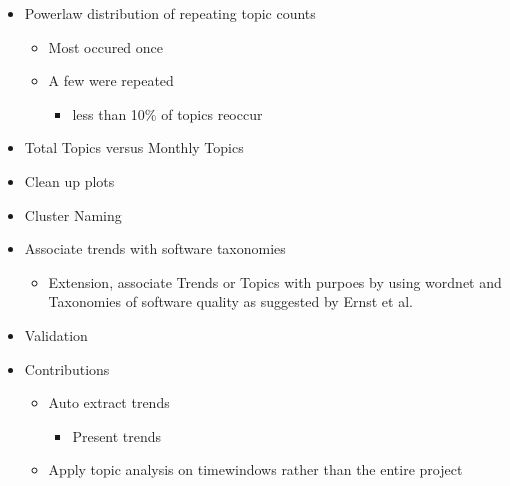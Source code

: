 \documentclass[titlepage,usenames,a4,landscape,semhelv]{seminar}
\begin{document}
\begin{slide}
\begin{itemize}
\begin{itemize}
\begin{itemize}
	\end{itemize}
\end{itemize}
\end{itemize}
\begin{itemize}
\item Powerlaw distribution of repeating topic counts
	\begin{itemize}
	\item Most occured once
	\item A few were repeated 
		\begin{itemize}
		\item less than 10\% of topics reoccur

	\end{itemize}
\end{itemize}
\end{itemize}
\begin{itemize}
\item Total Topics versus Monthly Topics
\item Clean up plots

\end{itemize}
\begin{itemize}
\item Cluster Naming
\item Associate trends with software taxonomies
	\begin{itemize}
	\item Extension, associate Trends or Topics with purpoes by using wordnet and Taxonomies of software quality as suggested by Ernst et al.
\end{itemize}
\item Validation

\end{itemize}
\begin{itemize}
\item Contributions
	\begin{itemize}
	\item Auto extract trends
		\begin{itemize}
		\item Present trends
\end{itemize}
	\item Apply topic analysis on timewindows rather than the entire project




\end{itemize}
\end{itemize}
\end{slide}
\end{document}
